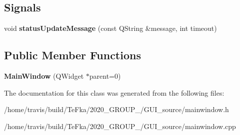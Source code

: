 \subsection*{Signals}
\begin{DoxyCompactItemize}
\item 
void {\bfseries status\+Update\+Message} (const Q\+String \&message, int timeout)\hypertarget{class_main_window_a86443ea744fda3e9bad328c2fd1c3d6b}{}\label{class_main_window_a86443ea744fda3e9bad328c2fd1c3d6b}

\end{DoxyCompactItemize}
\subsection*{Public Member Functions}
\begin{DoxyCompactItemize}
\item 
{\bfseries Main\+Window} (Q\+Widget $\ast$parent=0)\hypertarget{class_main_window_a8b244be8b7b7db1b08de2a2acb9409db}{}\label{class_main_window_a8b244be8b7b7db1b08de2a2acb9409db}

\end{DoxyCompactItemize}


The documentation for this class was generated from the following files\+:\begin{DoxyCompactItemize}
\item 
/home/travis/build/\+Te\+Fka/2020\+\_\+\+G\+R\+O\+U\+P\+\_/\+G\+U\+I\+\_\+source/mainwindow.\+h\item 
/home/travis/build/\+Te\+Fka/2020\+\_\+\+G\+R\+O\+U\+P\+\_/\+G\+U\+I\+\_\+source/mainwindow.\+cpp\end{DoxyCompactItemize}
